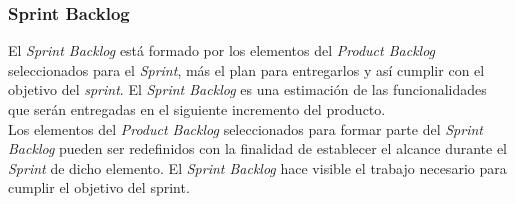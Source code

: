 \subsubsection{Sprint Backlog}

 El {\it Sprint Backlog} está formado por los elementos del {\it Product Backlog} seleccionados
 para el {\it Sprint}, más el plan para entregarlos y así cumplir con el objetivo del {\it sprint}.
 El {\it Sprint Backlog} es una estimación de las funcionalidades que serán entregadas en el siguiente
 incremento del producto.\\

 \noindent Los elementos del {\it Product Backlog} seleccionados para formar parte del {\it Sprint Backlog}
 pueden ser redefinidos con la finalidad de establecer el alcance durante el {\it Sprint} de dicho elemento.
 El {\it Sprint Backlog} hace visible el trabajo necesario para cumplir el objetivo del sprint.

\clearpage
